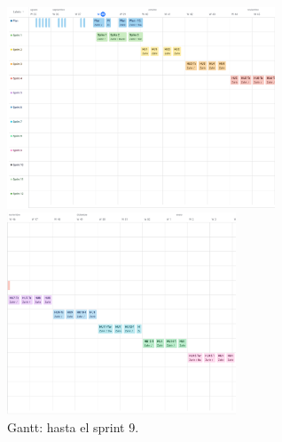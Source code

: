 \documentclass[
11pt, %
]{charter}
\begin{document}
\begin{figure}[htpb]
\begin{flushleft}

\begin{minipage}{0.50\textwidth}
    \includegraphics[height=6cm]{./Figuras/Gantt-1.png}
\end{minipage}%
\begin{minipage}{0.50\textwidth}
    \includegraphics[height=6cm]{./Figuras/Gantt-2.png}
\end{minipage}%
\caption{Gantt: hasta el sprint 9.}

\vspace{0.5cm} %


\end{flushleft}
\end{figure}
\end{document}
